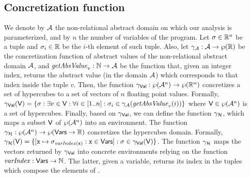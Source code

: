 \subsection{Concretization function}
\vspace{-5pt}
We denote by $\mathcal{A}$ the non-relational abstract domain on which our analysis is parameterized, and by $n$ the number of variables of the program. Let $\sigma \in \mathbb{R}^n$ be a tuple and $\sigma_i \in \mathbb{R}$ be the $i$-th element of such tuple. Also, let $\gamma_{\mathcal{A}} : \mathcal{A} \rightarrow\wp(\mathbb{R})$ be the concretization function of abstract values of the non-relational abstract domain $\mathcal{A}$, and $\mathit{getAbsValue}_v : \mathbb{N} \rightarrow\mathcal{A}$ be the function that, given an integer index, returns the abstract value (in the domain $\mathcal{A}$) which corresponds to that index inside the tuple $v$.
Then, the function $\gamma_{\mathsf{Val}} : \wp(\mathcal{A}^n) \rightarrow\wp(\mathbb{R}^n)$ concretizes a set of hypercubes to a set of vectors of $n$ floating point values. Formally, $\gamma_{\mathsf{Val}}(\mathsf{V}) = \{\sigma : \exists v \in \mathsf{V} : \forall i \in [1..n] : \sigma_i \in \gamma_{\mathcal{A}}(\mathit{getAbsValue}_v(i)) \}$ where $\mathsf{V} \in \wp(\mathcal{A}^n)$ is a set of hypercubes.
Finally, based on $\gamma_{\mathsf{Val}}$, we can define the function $\gamma_{\mathcal{H}}$, which maps a subset $\mathsf{V}$ of $\wp(\mathcal{A}^n)$ into an environment. The function $\gamma_{\mathcal{H}} : \wp(\mathcal{A}^n) \rightarrow\wp(\mathsf{Vars} \rightarrow\mathbb{R})$ concretizes the hypercubes domain. Formally, $\gamma_{\mathcal{H}}(\mathsf{V}) = \{[\mathtt{x} \mapsto \mathsf{\sigma}_{\mathit{varIndex}(\mathtt{x})} : \mathtt{x} \in \mathsf{Vars}] : \mathsf{\sigma} \in \gamma_{\mathsf{Val}}(\mathsf{V})\}$.  The function $\gamma_{\mathcal{H}}$ maps the vectors returned by $\gamma_{\mathsf{Val}}$ into concrete environments relying on the function $\mathit{varIndex} : \mathsf{Vars} \rightarrow\mathbb{N}$. The latter, given a variable, returns its index in the tuples which compose the elements of \adomain.


